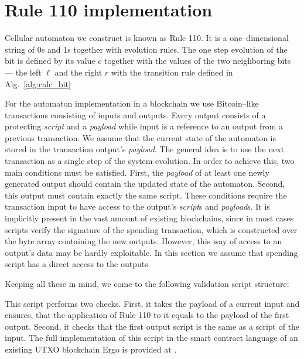 \documentclass[runningheads]{llncs}
\newcommand{\payload}{\textit{payload}}
\newcommand{\script}{\textit{script}}
\begin{document}
    \section{Rule 110 implementation}
    \label{section2}
    Cellular automaton we construct is known as Rule 110.  It is a
    one--dimensional string of 0s and 1s together with evolution rules.  The one
    step evolution of the bit is defined by its value $c$ together with the
    values of the two neighboring bits --- the left $\ell$ and the right $r$
    with the transition rule defined in Alg.~\ref{alg:calc_bit}
    

    For the automaton implementation in a blockchain we use Bitcoin--like
    transactions consisting of inputs and outputs. Every output consists of a
    protecting \script{} and a \payload{} while input is a reference to an
    output from a previous transaction.  We assume that the current state of the
    automaton is stored in the transaction output's \payload{}.  The general
    idea is to use the next transaction as a single step of the system
    evolution. In order to achieve this, two main conditions must be satisfied.
    First, the \payload{} of at least one newly generated output should contain
    the updated state of the automaton. Second, this output must contain exactly
    the same script. These conditions require the transaction input to have
    access to the output's \script{}s and \payload{}s.  It is implicitly present
    in the vast amount of existing blockchains, since in most cases scripts
    verify the signature of the spending transaction, which is constructed over
    the byte array containing the new outputs.  However, this way of access to
    an output's data may be hardly exploitable.  In this section we assume that
    spending script has a direct access to the outputs.

    Keeping all these in mind, we come to the following validation
    script structure:
    
    This script performs two checks. First, it takes the payload of a current
    input and ensures, that the application of Rule 110 to it equals to the
    payload of the first output. Second, it checks that the first output script
    is the same as a script of the input. The full implementation of this script
    in the smart contract language of an existing UTXO blockchain Ergo is
    provided at \cite{ergoScript1}.
\end{document}
